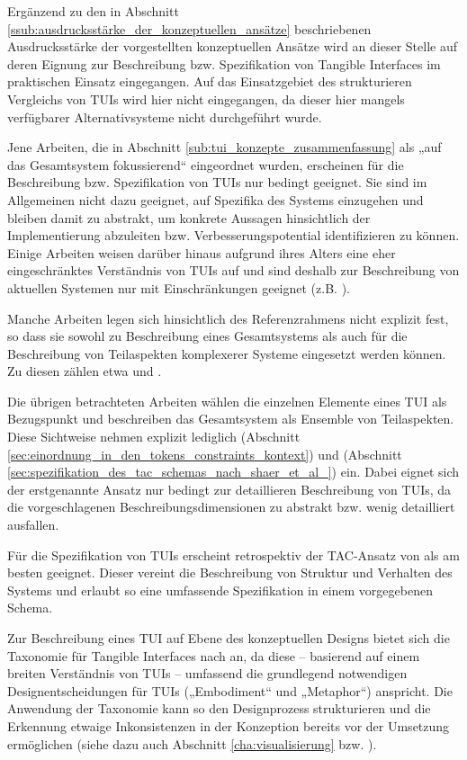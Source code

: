 Ergänzend zu den in Abschnitt \ref{ssub:ausdrucksstärke_der_konzeptuellen_ansätze} beschriebenen Ausdrucksstärke der vorgestellten konzeptuellen Ansätze wird an dieser Stelle auf deren Eignung zur Beschreibung bzw. Spezifikation von Tangible Interfaces im praktischen Einsatz eingegangen. Auf das Einsatzgebiet des strukturieren Vergleichs von \glspl{TUI} wird hier nicht eingegangen, da dieser hier mangels verfügbarer Alternativsysteme nicht durchgeführt wurde.

Jene Arbeiten, die in Abschnitt \ref{sub:tui_konzepte_zusammenfassung} als „auf das Gesamtsystem fokussierend“ eingeordnet wurden, erscheinen für die Beschreibung bzw. Spezifikation von \glspl{TUI} nur bedingt geeignet. Sie sind im Allgemeinen nicht dazu geeignet, auf Spezifika des Systems einzugehen und bleiben damit zu abstrakt, um konkrete Aussagen hinsichtlich der Implementierung abzuleiten bzw. Verbesserungspotential identifizieren zu können. Einige Arbeiten weisen darüber hinaus aufgrund ihres Alters eine eher eingeschränktes Verständnis von \glspl{TUI} auf und sind deshalb zur Beschreibung von aktuellen Systemen nur mit Einschränkungen geeignet (z.B. \citep{Fitzmaurice96}).

Manche Arbeiten legen sich hinsichtlich des Referenzrahmens nicht explizit fest, so dass sie sowohl zu Beschreibung eines Gesamtsystems als auch für die Beschreibung von Teilaspekten komplexerer Systeme eingesetzt werden können. Zu diesen zählen etwa \citep{Koleva03} und \citet{Fishkin04}.

Die übrigen betrachteten Arbeiten wählen die einzelnen Elemente eines \gls{TUI} als Bezugspunkt und beschreiben das Gesamtsystem als Ensemble von Teilaspekten. Diese Sichtweise nehmen explizit lediglich \citep{Ullmer05} (Abschnitt \ref{sec:einordnung_in_den_tokens_constraints_kontext}) und \citep{Shaer04} (Abschnitt \ref{sec:spezifikation_des_tac_schemas_nach_shaer_et_al_}) ein. Dabei eignet sich der erstgenannte Ansatz nur bedingt zur detaillieren Beschreibung von \glspl{TUI}, da die vorgeschlagenen Beschreibungsdimensionen zu abstrakt bzw. wenig detailliert ausfallen.

Für die Spezifikation von \glspl{TUI} erscheint retrospektiv der TAC-Ansatz von \citet{Shaer04} als am besten geeignet. Dieser vereint die Beschreibung von Struktur und Verhalten des Systems und erlaubt so eine umfassende Spezifikation in einem vorgegebenen Schema. 

Zur Beschreibung eines \gls{TUI} auf Ebene des konzeptuellen Designs bietet sich die Taxonomie für Tangible Interfaces nach \citet{Fishkin04} an, da diese -- basierend auf einem breiten Verständnis von \glspl{TUI} -- umfassend die grundlegend notwendigen Designentscheidungen für \glspl{TUI} („Embodiment“ und „Metaphor“) anspricht. Die Anwendung der Taxonomie kann so den Designprozess strukturieren und die Erkennung etwaige Inkonsistenzen in der Konzeption bereits vor der Umsetzung ermöglichen (siehe dazu auch Abschnitt \ref{cha:visualisierung} bzw. \citep{Oppl09d}). 

